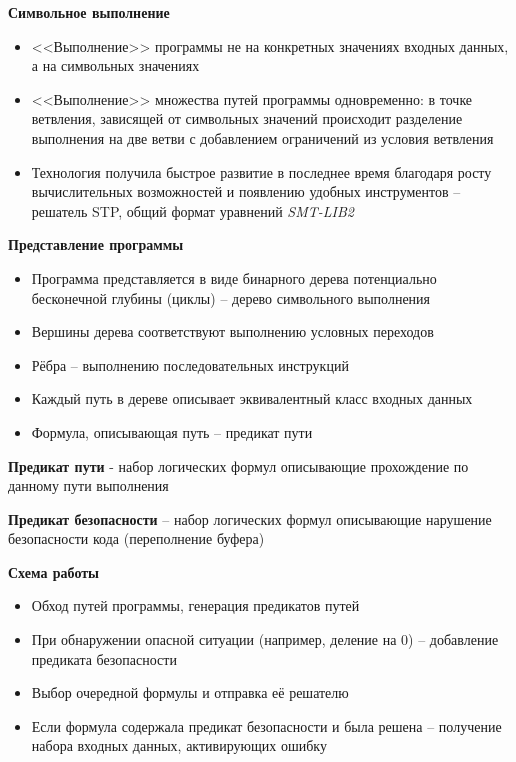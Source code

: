 
\textbf{Символьное выполнение}
\begin{itemize}
    \item <<Выполнение>> программы не на конкретных значениях входных данных, а на символьных значениях
    \item <<Выполнение>> множества путей программы одновременно: в точке ветвления, зависящей от символьных значений происходит разделение выполнения на две ветви с добавлением ограничений из условия ветвления
    \item Технология получила быстрое развитие в последнее время благодаря росту вычислительных возможностей и появлению удобных инструментов – решатель STP, общий формат уравнений \textit{SMT-LIB2}
\end{itemize}

\textbf{Представление программы}
\begin{itemize}
    \item Программа представляется в виде бинарного дерева потенциально бесконечной глубины (циклы) – дерево символьного выполнения
    \item Вершины дерева соответствуют выполнению условных переходов
    \item Рёбра – выполнению последовательных инструкций
    \item Каждый путь в дереве описывает эквивалентный класс входных данных
    \item Формула, описывающая путь – предикат пути
\end{itemize}

\textbf{Предикат пути} - набор логических формул описывающие прохождение по данному пути выполнения

\textbf{Предикат безопасности} – набор логических формул описывающие нарушение
безопасности кода (переполнение буфера)

\textbf{Схема работы}
\begin{itemize}
    \item Обход путей программы, генерация предикатов путей
    \item При обнаружении опасной ситуации (например, деление на 0) – добавление предиката безопасности
    \item Выбор очередной формулы и отправка её решателю
    \item Если формула содержала предикат безопасности и была решена – получение набора входных данных, активирующих ошибку
\end{itemize}

